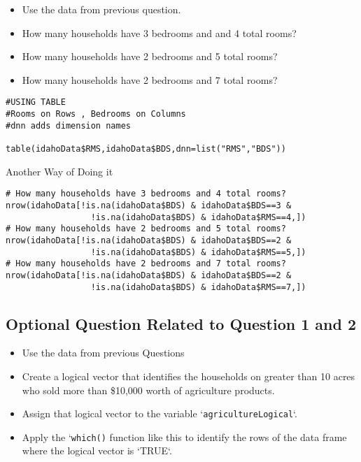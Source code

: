 \documentclass[]{article}
\begin{document}
\begin{itemize}
\item Use the data from previous question. 
\item How many households have 3 bedrooms and and 4 total rooms? 
\item How many households have 2 bedrooms and 5 total rooms? 
\item How many households have 2 bedrooms and 7 total rooms?
\end{itemize}
\begin{framed}
\begin{verbatim}
#USING TABLE
#Rooms on Rows , Bedrooms on Columns
#dnn adds dimension names

table(idahoData$RMS,idahoData$BDS,dnn=list("RMS","BDS"))

\end{verbatim}
\end{framed}
Another Way of Doing it
\begin{framed}
\begin{verbatim}
# How many households have 3 bedrooms and 4 total rooms?
nrow(idahoData[!is.na(idahoData$BDS) & idahoData$BDS==3 &
                 !is.na(idahoData$BDS) & idahoData$RMS==4,])
# How many households have 2 bedrooms and 5 total rooms?
nrow(idahoData[!is.na(idahoData$BDS) & idahoData$BDS==2 &
                 !is.na(idahoData$BDS) & idahoData$RMS==5,])
# How many households have 2 bedrooms and 7 total rooms?
nrow(idahoData[!is.na(idahoData$BDS) & idahoData$BDS==2 &
                 !is.na(idahoData$BDS) & idahoData$RMS==7,])

\end{verbatim}
\end{framed}


\newpage
\subsection*{Optional Question Related to Question 1 and 2}
\begin{itemize}
\item Use the data from previous Questions 
\item Create a logical vector that identifies the households on greater than 10 acres who sold more than \$10,000 worth of agriculture products. 
\item Assign that logical vector to the variable `\texttt{agricultureLogical}`. 
\item Apply the `\texttt{which()} function like this to identify the rows of the data frame where the logical vector is `TRUE`.
\end{itemize}
\end{document}
